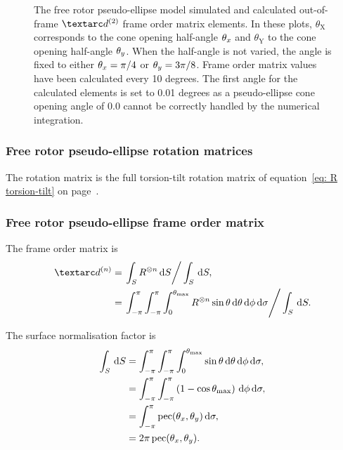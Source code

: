 \begin{figure}
\begin{tabular}{@{}cc@{}}
  \end{tabular}
  \caption[Free rotor pseudo-ellipse simulated and calculated out-of-frame Daeg$^{(2)}$ elements.]{
    The free rotor pseudo-ellipse model simulated and calculated out-of-frame $\FOtwo$ frame order matrix elements.
    In these plots, $\theta_\textrm{X}$ corresponds to the cone opening half-angle $\theta_x$ and $\theta_\textrm{Y}$ to the cone opening half-angle $\theta_y$.
    When the half-angle is not varied, the angle is fixed to either $\theta_x = \pi/4$ or $\theta_y = 3\pi/8$.
    Frame order matrix values have been calculated every 10 degrees.
    The first angle for the calculated elements is set to 0.01 degrees as a pseudo-ellipse cone opening angle of 0.0 cannot be correctly handled by the numerical integration.
  }
  \label{fig: simulated and calculated out-of-frame 2nd degree pseudo-ellipse, free rotor frame order}
\end{figure}


\subsubsection{Free rotor pseudo-ellipse rotation matrices}

The rotation matrix is the full torsion-tilt rotation matrix of equation~\ref{eq: R torsion-tilt} on page~\pageref{eq: R torsion-tilt}.


\subsubsection{Free rotor pseudo-ellipse frame order matrix}

The frame order matrix is
\begin{subequations}
\begin{align}
    \FOn &= \left. \int_S R^{\otimes n} \diff S \right / \int_S \diff S , \\
         &= \left. \int_{-\pi}^{\pi} \int_{-\pi}^{\pi} \int_{0}^{\conethetamax} R^{\otimes n} \sin\theta \diff\theta \diff\phi \diff\sigma  \right / \int_S \diff S .
\end{align}
\end{subequations}

The surface normalisation factor is
\begin{subequations}
\begin{align}
    \int_S \,\mathrm{d} S &= \int_{-\pi}^{\pi} \int_{-\pi}^{\pi} \int_{0}^{\theta_\textrm{max}} \sin\theta \,\mathrm{d}\theta \,\mathrm{d}\phi \,\mathrm{d}\sigma , \\
                   &= \int_{-\pi}^{\pi} \int_{-\pi}^{\pi} \left( 1 - \cos\theta_\textrm{max} \right) \,\mathrm{d}\phi \,\mathrm{d}\sigma , \\
                   &= \int_{-\pi}^{\pi} \operatorname{pec}(\theta_x, \theta_y) \,\mathrm{d}\sigma , \\
                   &= 2\pi \operatorname{pec}(\theta_x, \theta_y) .
\end{align}
\end{subequations}


